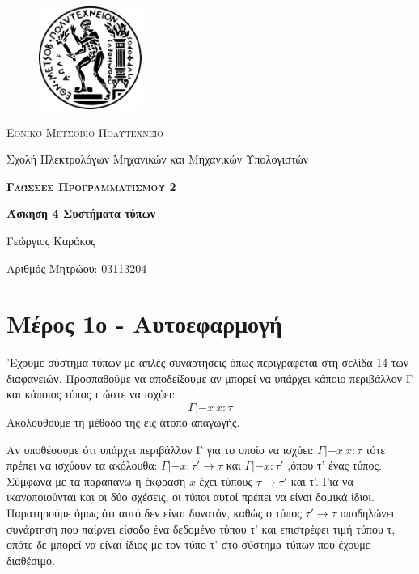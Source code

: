 \documentclass[11pt,a4paper]{report}
\begin{document}
\begin{titlepage}
	\centering
	\begin{figure}
	\centering
	\includegraphics[width=0.3\textwidth]{pyrforos-digamma}
	\end{figure}
	{\scshape Εθνικό Μετσόβιο Πολυτεχνείο \par Σχολή Ηλεκτρολόγων Μηχανικών και Μηχανικών Υπολογιστών\par}
	\vspace{0.5cm}
	{\scshape \textbf{Γλώσσες Προγραμματισμού 2} \par \textbf{Άσκηση 4 Συστήματα τύπων}\par}
	\vspace{0.5cm}
	{\Large Γεώργιος Καράκος\par} 
	\vspace{0.5cm}
	{\Large Αριθμός Μητρώου: 03113204\par}
	
	
	\vfill

\end{titlepage}

\chapter*{Μέρος 1ο - Αυτοεφαρμογή}
\par 'Εχουμε σύστημα τύπων με απλές συναρτήσεις όπως περιγράφεται στη σελίδα 14 των διαφανειών. Προσπαθούμε να αποδείξουμε αν μπορεί να υπάρχει κάποιο περιβάλλον Γ και κάποιος τύπος τ ώστε να ισχύει:
$$\Gamma|- x \ x:\tau$$
Ακολουθούμε τη μέθοδο της εις άτοπο απαγωγής.

Αν υποθέσουμε ότι υπάρχει περιβάλλον Γ για το οποίο να ισχύει:
$\Gamma|- x \ x : \tau$
τότε πρέπει να ισχύουν τα ακόλουθα:
$\Gamma|- x : \tau' \rightarrow \tau$    και   $\Gamma|- x : \tau'$    
,όπου τ' ένας τύπος.
Σύμφωνα με τα παραπάνω η έκφραση $x$ έχει τύπους $\tau \rightarrow \tau'$ και τ'. Για να ικανοποιούνται και οι δύο σχέσεις, οι τύποι αυτοί πρέπει να είναι δομικά ίδιοι. Παρατηρούμε όμως ότι αυτό δεν είναι δυνατόν, καθώς ο τύπος $\tau' \rightarrow \tau$ υποδηλώνει συνάρτηση που παίρνει είσοδο ένα δεδομένο τύπου τ' και επιστρέφει τιμή τύπου τ, οπότε δε μπορεί να είναι ίδιος με τον τύπο τ' στο σύστημα τύπων που έχουμε διαθέσιμο.
\end{document}
